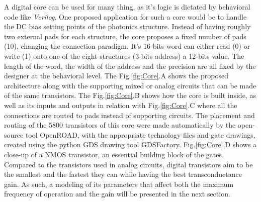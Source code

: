 A digital core can be used for many thing, as it's logic is dictated by behavioral code like \textit{Verilog}.
One proposed application for such a core would be to handle the DC bias setting points of the photonics structure.
Instead of having roughly two external pads for each structure, the core proposes a fixed number of pads (10), changing the connection paradigm.
It's 16-bits word can either read (0) or write (1) onto one of the eight structures (3-bits address) a 12-bits value. 
The length of the word, the width of the address and the precision are all fixed by the designer at the behavioral level. 
The Fig.\ref{fig:Core}.A shows the proposed architecture along with the supporting mixed or analog circuits that can be made of the same transistors. 
The Fig.\ref{fig:Core}.B shows how the core is built inside, as well as its inputs and outputs in relation with Fig.\ref{fig:Core}.C where all the connections are routed to pads instead of supporting circuits. 
The placement and routing of the 5800 transistors of this core were made automatically by the open-source tool OpenROAD\cite{ajayi_openroad_2019}, with the appropriate technology files and gate drawings, created using the python GDS drawing tool GDSFactory.
Fig.\ref{fig:Core}.D shows a close-up of a NMOS transistor, an essential building block of the gates. 
Compared to the transistors used in analog circuits, digital transistors aim to be the smallest and the fastest they can while having the best transconductance gain. 
As such, a modeling of its parameters that affect both the maximum frequency of operation and the gain will be presented in the next section. 



 